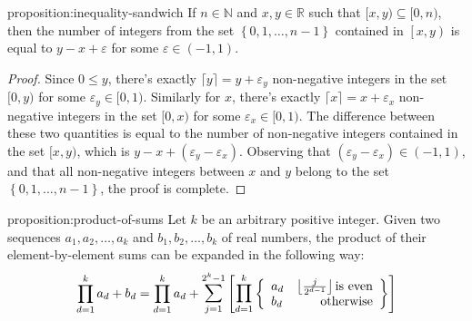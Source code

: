 \documentclass[11pt,a4paper]{tesis}
\theoremstyle{plain}
\theoremstyle{definition}
\begin{document}
\begin{repproposition}{proposition:inequality-sandwich}
  If $n \in \mathbb{N}$ and $x, y \in \mathbb{R}$ such that $[x, y) \subseteq [0, n)$, then the number of integers from the set $\left \{ 0, 1, \dots, n - 1 \right \}$ contained in $\left[x, y\right)$ is equal to $y - x + \varepsilon$ for some $\varepsilon \in (-1, 1)$.
\end{repproposition}

\begin{proof}
  Since $0 \le y$, there's exactly $\lceil y \rceil = y + \varepsilon_y$ non-negative integers in the set $[0, y)$ for some $\varepsilon_y \in [0, 1)$. Similarly for $x$, there's exactly $\lceil x \rceil = x + \varepsilon_x$ non-negative integers in the set $[0, x)$ for some $\varepsilon_x \in [0, 1)$. The difference between these two quantities is equal to the number of non-negative integers contained in the set $[x, y)$, which is $y - x + (\varepsilon_y - \varepsilon_x)$. Observing that $(\varepsilon_y - \varepsilon_x) \in (-1, 1)$, and that all non-negative integers between $x$ and $y$ belong to the set $\left \{ 0, 1, \dots, n - 1 \right \}$, the proof is complete.
\end{proof}

\begin{repproposition}{proposition:product-of-sums}
  Let $k$ be an arbitrary positive integer. Given two sequences $a_1, a_2, \dots, a_k$ and $b_1, b_2, \dots, b_k$ of real numbers, the product of their element-by-element sums can be expanded in the following way:
  \begin{equation*}
    \prod_{d = 1}^{k} a_d + b_d = \prod_{d = 1}^{k} a_d + \mathlarger{\sum}_{j = 1}^{2^k - 1} \left [ \mathlarger{\prod}_{d = 1}^{k}
      \left \{ \begin{array}{lr}
        a_d & \left\lfloor \frac{j}{2^{d - 1}} \right\rfloor \text{is even} \\
        b_d & \text{otherwise}
      \end{array} \right \} \right ]
  \end{equation*}
\end{repproposition}
\end{document}
